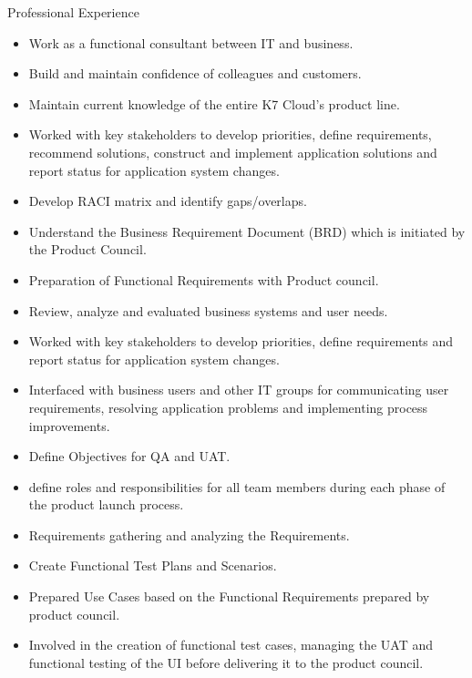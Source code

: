 \documentclass[a4paper,12pt]{article}
\begin{document}
\begin{resumeblock}{Professional Experience}

  \begin{itemize} %
    \item Work as a functional consultant between IT and business.
    \item Build and maintain confidence of colleagues and customers.
    \item Maintain current knowledge of the entire K7 Cloud’s product line.
    \item Worked with key stakeholders to develop priorities, define requirements, recommend solutions, construct and implement application solutions and report status for application system changes.
    \item Develop RACI matrix and identify gaps/overlaps.
    \item Understand the Business Requirement Document (BRD) which is initiated by the Product Council.
    \item Preparation of Functional Requirements with Product council. 
    \item Review, analyze and evaluated business systems and user needs.
    \item Worked with key stakeholders to develop priorities, define requirements and report status for application system changes.
    \item Interfaced with business users and other IT groups  for communicating user requirements, resolving application problems and implementing process improvements.
    \item Define Objectives for QA and UAT. 
    \item define roles and responsibilities for all team members during each phase of the product launch process.

    \item Requirements gathering and analyzing the Requirements.
    \item Create Functional Test Plans and Scenarios.
    \item Prepared Use Cases based on the Functional Requirements prepared by product council. 
    \item Involved in the creation of functional test cases, managing the UAT and functional testing of the UI before delivering it to the product council. 
  \end{itemize}
\shortskip


\end{resumeblock}
\end{document}
